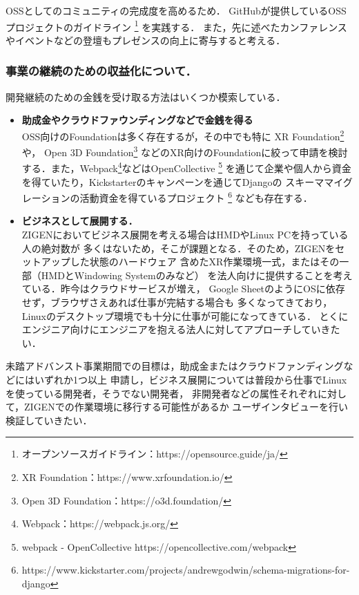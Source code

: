 OSSとしてのコミュニティの完成度を高めるため．
GitHubが提供しているOSSプロジェクトのガイドライン
\footnote{オープンソースガイドライン：https://opensource.guide/ja/}
を実践する．
また，先に述べたカンファレンスやイベントなどの登壇もプレゼンスの向上に寄与すると考える．

\subsubsection*{事業の継続のための収益化について．}

開発継続のための金銭を受け取る方法はいくつか模索している．

\begin{itemize}
  \item \textbf{助成金やクラウドファウンディングなどで金銭を得る\\}
        OSS向けのFoundationは多く存在するが，その中でも特に
        XR Foundation\footnote{XR Foundation：https://www.xrfoundation.io/}や，
        Open 3D Foundation\footnote{Open 3D Foundation：https://o3d.foundation/}
        などのXR向けのFoundationに絞って申請を検討する．また，Webpack\footnote{Webpack：https://webpack.js.org/}などはOpenCollective
        \footnote{webpack - OpenCollective https://opencollective.com/webpack}
        を通じて企業や個人から資金を得ていたり，Kickstarterのキャンペーンを通じてDjangoの
        スキーママイグレーションの活動資金を得ているプロジェクト
        \footnote{https://www.kickstarter.com/projects/andrewgodwin/schema-migrations-for-django}
        なども存在する．
  \item \textbf{ビジネスとして展開する．\\}
        ZIGENにおいてビジネス展開を考える場合はHMDやLinux PCを持っている人の絶対数が
        多くはないため，そこが課題となる．そのため，ZIGENをセットアップした状態のハードウェア
        含めたXR作業環境一式，またはその一部（HMDとWindowing Systemのみなど）
        を法人向けに提供することを考えている．昨今はクラウドサービスが増え，
        Google SheetのようにOSに依存せず，ブラウザさえあれば仕事が完結する場合も
        多くなってきており，Linuxのデスクトップ環境でも十分に仕事が可能になってきている．
        とくにエンジニア向けにエンジニアを抱える法人に対してアプローチしていきたい．
\end{itemize}

未踏アドバンスト事業期間での目標は，助成金またはクラウドファンディングなどにはいずれか1つ以上
申請し，ビジネス展開については普段から仕事でLinuxを使っている開発者，そうでない開発者，
非開発者などの属性それぞれに対して，ZIGENでの作業環境に移行する可能性があるか
ユーザインタビューを行い検証していきたい．

